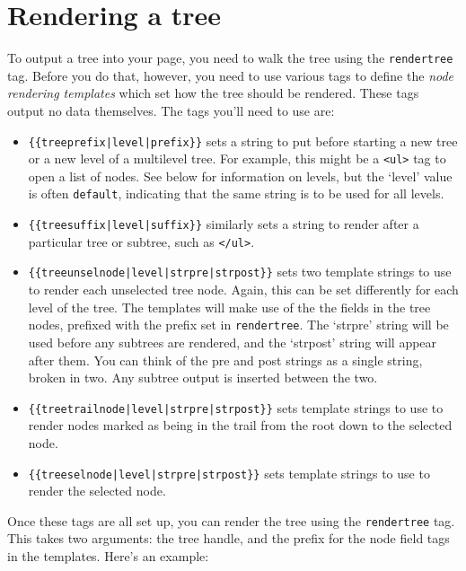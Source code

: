 \section{Rendering a tree}
\label{treerender}
To output a tree into your page, you need to walk the tree using the
\texttt{rendertree} tag. Before you do that, however, you need to use various tags
to define the \emph{node rendering templates}
which set how the tree should be rendered. These tags output no data
themselves. The tags you'll need to use are:
\begin{itemize}
 \item \verb,{{treeprefix|level|prefix}}, sets a string to put before starting a new tree or a new level of a
 multilevel tree. For example, this might be a \texttt{<ul>} tag to open a list of nodes. See below for
 information on levels, but the `level' value is often \texttt{default}, indicating that the same string is to be used for
 all levels.
\item \verb,{{treesuffix|level|suffix}}, similarly sets a string to render after a particular tree or subtree,
 such as \texttt{</ul>}.
\item \verb,{{treeunselnode|level|strpre|strpost}}, sets two template strings to use to render each unselected tree
 node. Again,
 this can be set differently for each level of the tree. The templates will make use of the the fields 
 in the tree nodes, prefixed with the prefix set in \texttt{rendertree}. The `strpre' string will be used 
 before any subtrees are rendered, and the `strpost' string will appear after them. You can think of the
 pre and post strings as a single string, broken in two. Any subtree output is inserted between the two.
\item \verb,{{treetrailnode|level|strpre|strpost}}, sets template strings to use to render nodes marked
as being in the trail from the root down to the selected node.
\item \verb,{{treeselnode|level|strpre|strpost}}, sets template strings to use to render the selected node.
\end{itemize}

\clearpage
Once these tags are all set up, you can render the tree using the
\texttt{{rendertree}} tag. This takes two arguments: the tree handle, and the
prefix for the node field tags in the templates. Here's an example:

